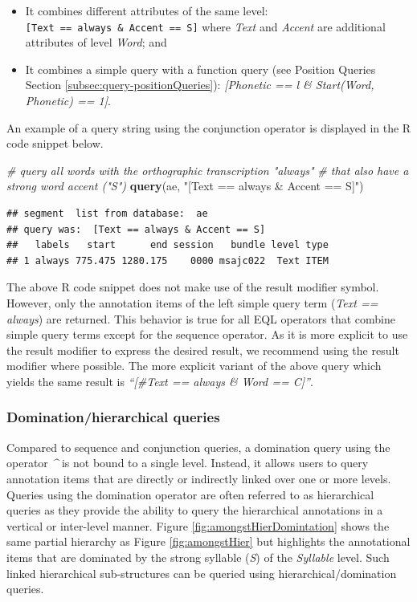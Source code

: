 \documentclass[]{book}
\newenvironment{Shaded}{\begin{snugshade}}{\end{snugshade}}
\newcommand{\CommentTok}[1]{\textcolor[rgb]{0.56,0.35,0.01}{\textit{#1}}}
\newcommand{\KeywordTok}[1]{\textcolor[rgb]{0.13,0.29,0.53}{\textbf{#1}}}
\newcommand{\NormalTok}[1]{#1}
\newcommand{\StringTok}[1]{\textcolor[rgb]{0.31,0.60,0.02}{#1}}
\providecommand{\tightlist}{%
  \setlength{\itemsep}{0pt}\setlength{\parskip}{0pt}}
\theoremstyle{definition}
\theoremstyle{definition}
\theoremstyle{definition}
\theoremstyle{remark}
\begin{document}
\begin{itemize}
\tightlist
\item
  It combines different attributes of the same level:
  \texttt{{[}Text\ ==\ always\ \&\ Accent\ ==\ S{]}} where \emph{Text}
  and \emph{Accent} are additional attributes of level \emph{Word}; and
\item
  It combines a simple query with a function query (see Position Queries
  Section \ref{subsec:query-positionQueries}): \emph{{[}Phonetic == l \&
  Start(Word, Phonetic) == 1{]}}.
\end{itemize}

An example of a query string using the conjunction operator is displayed
in the R code snippet below.

\begin{Shaded}
\begin{Highlighting}[]
\CommentTok{# query all words with the orthographic transcription "always"}
\CommentTok{# that also have a strong word accent ("S")}
\KeywordTok{query}\NormalTok{(ae, }\StringTok{"[Text == always & Accent == S]"}\NormalTok{)}
\end{Highlighting}
\end{Shaded}

\begin{verbatim}
## segment  list from database:  ae 
## query was:  [Text == always & Accent == S] 
##   labels   start      end session   bundle level type
## 1 always 775.475 1280.175    0000 msajc022  Text ITEM
\end{verbatim}

The above R code snippet does not make use of the result modifier
symbol. However, only the annotation items of the left simple query term
(\emph{Text == always}) are returned. This behavior is true for all EQL
operators that combine simple query terms except for the sequence
operator. As it is more explicit to use the result modifier to express
the desired result, we recommend using the result modifier where
possible. The more explicit variant of the above query which yields the
same result is \emph{``{[}\#Text == always \& Word == C{]}''}.

\hypertarget{subsubsec:query_dominationQueries}{%
\subsubsection{Domination/hierarchical
queries}\label{subsubsec:query_dominationQueries}}

Compared to sequence and conjunction queries, a domination query using
the operator \emph{\^{}} is not bound to a single level. Instead, it
allows users to query annotation items that are directly or indirectly
linked over one or more levels. Queries using the domination operator
are often referred to as hierarchical queries as they provide the
ability to query the hierarchical annotations in a vertical or
inter-level manner. Figure \ref{fig:amongstHierDomintation} shows the
same partial hierarchy as Figure \ref{fig:amongstHier} but highlights
the annotational items that are dominated by the strong syllable
(\emph{S}) of the \emph{Syllable} level. Such linked hierarchical
sub-structures can be queried using hierarchical/domination queries.
\end{document}
